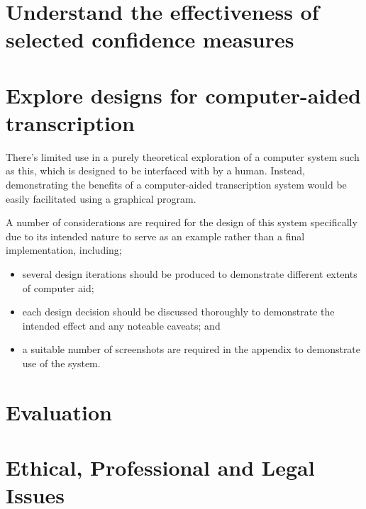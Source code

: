 \section{Understand the effectiveness of selected confidence measures}

\section{Explore designs for computer-aided transcription}

There's limited use in a purely theoretical exploration of a computer system such as this, which is designed to be interfaced with by a human.
Instead, demonstrating the benefits of a computer-aided transcription system would be easily facilitated using a graphical program.

A number of considerations are required for the design of this system specifically due to its intended nature to serve as an example rather than a final implementation, including;

\begin{itemize}
        \item several design iterations should be produced to demonstrate different extents of computer aid;
        \item each design decision should be discussed thoroughly to demonstrate the intended effect and any noteable caveats; and
        \item a suitable number of screenshots are required in the appendix to demonstrate use of the system.
\end{itemize}

\section{Evaluation}

\section{Ethical, Professional and Legal Issues}

